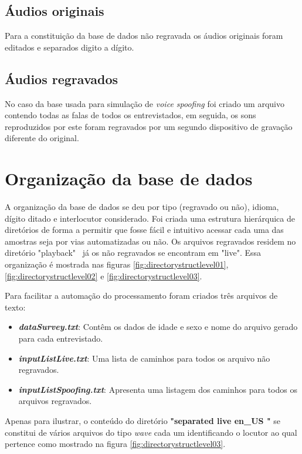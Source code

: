 \begin{myenv}{1.5}
			\subsection{Áudios originais}
				\par Para a constituição da base de dados não regravada os áudios originais foram editados e separados digito a dígito.
	
			\subsection{Áudios regravados}
				\par No caso da base usada para simulação de \textit{voice spoofing} foi criado um arquivo contendo todas as falas de todos os entrevistados, em seguida, os sons reproduzidos por este foram regravados por um segundo dispositivo de gravação diferente do original.

		\section{Organização da base de dados}
			\par A organização da base de dados se deu por tipo (regravado ou não), idioma, dígito ditado e interlocutor considerado. Foi criada uma estrutura hierárquica de diretórios de forma a permitir que fosse fácil e intuitivo acessar cada uma das amostras seja por vias automatizadas ou não. Os arquivos regravados residem no diretório "playback" \ já os não regravados se encontram em "live".	Essa organização é mostrada nas figuras \ref{fig:directorystructlevel01}, \ref{fig:directorystructlevel02} e \ref{fig:directorystructlevel03}.
			
			\par Para facilitar a automação do processamento foram criados três arquivos de texto:
			\begin{itemize}
				\item \textit{\textbf{dataSurvey.txt}}: Contêm os dados de idade e sexo e nome do arquivo gerado para cada entrevistado.
				\item \textit{\textbf{inputListLive.txt}}: Uma lista de caminhos para todos os arquivo não regravados.
				\item \textit{\textbf{inputListSpoofing.txt}}: Apresenta uma listagem dos caminhos para todos os arquivos regravados.
			\end{itemize}
		
			\par Apenas para ilustrar, o conteúdo do diretório \textbf{"separated \textfractionsolidus live \textfractionsolidus en\_US "} se constitui de vários arquivos do tipo \textit{wave} cada um identificando o locutor ao qual pertence como mostrado na  figura \ref{fig:directorystructlevel03}.
				

\end{myenv}
